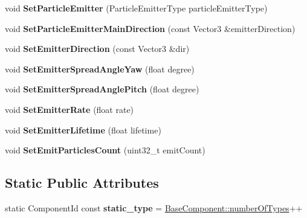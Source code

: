 \begin{DoxyCompactItemize}
\mbox{\label{classParticleEmitterComponent_af3b8d001c86a67fb09cf955c1a735af5}} 
void {\bfseries Set\+Particle\+Emitter} (Particle\+Emitter\+Type particle\+Emitter\+Type)
\item 
\mbox{\label{classParticleEmitterComponent_a1c6e97911f6348863f78d9a37306e7cb}} 
void {\bfseries Set\+Particle\+Emitter\+Main\+Direction} (const Vector3 \&emitter\+Direction)
\item 
\mbox{\label{classParticleEmitterComponent_ad600125d3f9a5989c60a7726dea2dec2}} 
void {\bfseries Set\+Emitter\+Direction} (const Vector3 \&dir)
\item 
\mbox{\label{classParticleEmitterComponent_a4e0615191415af6d3534e66b1cfa3b1c}} 
void {\bfseries Set\+Emitter\+Spread\+Angle\+Yaw} (float degree)
\item 
\mbox{\label{classParticleEmitterComponent_a9ca65ff05b2dfe29d99af163b67d84e9}} 
void {\bfseries Set\+Emitter\+Spread\+Angle\+Pitch} (float degree)
\item 
\mbox{\label{classParticleEmitterComponent_a162492a203be9765f0d0e893d8dc26f9}} 
void {\bfseries Set\+Emitter\+Rate} (float rate)
\item 
\mbox{\label{classParticleEmitterComponent_a91972e2829066cc0bdddae9af191ec26}} 
void {\bfseries Set\+Emitter\+Lifetime} (float lifetime)
\item 
\mbox{\label{classParticleEmitterComponent_af4f1eb7736e98bc8cc74a51e62517549}} 
void {\bfseries Set\+Emit\+Particles\+Count} (uint32\+\_\+t emit\+Count)
\end{DoxyCompactItemize}
\subsection*{Static Public Attributes}
\begin{DoxyCompactItemize}
\item 
\mbox{\label{classParticleEmitterComponent_a2a53fbaf367f600cf660daa875af0efd}} 
static Component\+Id const {\bfseries static\+\_\+type} = \hyperlink{classBaseComponent_a084ade347bc71a7f0d3b17ecdc2225a4}{Base\+Component\+::number\+Of\+Types}++
\end{DoxyCompactItemize}
